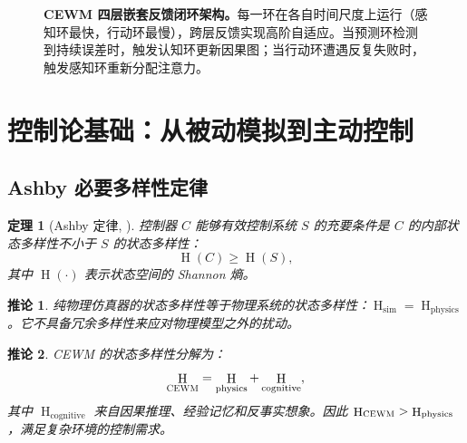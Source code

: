 \documentclass[11pt,a4paper]{article}
\newtheorem{theorem}{定理}[section]
\newtheorem{corollary}{推论}[theorem]
\newcommand{\CEWM}{\textsc{CEWM}}
\DeclareMathOperator{\Ent}{H}
\begin{document}
\begin{figure}[H]
{%
}
\caption{\textbf{\CEWM{} 四层嵌套反馈闭环架构。}每一环在各自时间尺度上运行（感知环最快，行动环最慢），跨层反馈实现高阶自适应。当预测环检测到持续误差时，触发认知环更新因果图；当行动环遭遇反复失败时，触发感知环重新分配注意力。}\label{fig:four-loops}
\end{figure}

\section{控制论基础：从被动模拟到主动控制}\label{sec:cybernetics}

\subsection{Ashby 必要多样性定律}

\begin{theorem}[Ashby 定律, \citeyear{ashby1956cybernetics}]\label{thm:ashby}
控制器 $C$ 能够有效控制系统 $S$ 的充要条件是 $C$ 的内部状态多样性不小于 $S$ 的状态多样性：
\begin{equation}\label{eq:ashby}
  \Ent(C) \geq \Ent(S),
\end{equation}
其中 $\Ent(\cdot)$ 表示状态空间的 Shannon 熵。
\end{theorem}

\begin{corollary}\label{cor:sim}
纯物理仿真器的状态多样性等于物理系统的状态多样性：$\Ent_{\mathrm{sim}} = \Ent_{\mathrm{physics}}$。它不具备\emph{冗余多样性}来应对物理模型之外的扰动。
\end{corollary}

\begin{corollary}\label{cor:cewm}
\CEWM{} 的状态多样性分解为：
\begin{equation}\label{eq:cewm-variety}
  \Ent_{\CEWM} = \Ent_{\mathrm{physics}} + \Ent_{\mathrm{cognitive}},
\end{equation}
其中 $\Ent_{\mathrm{cognitive}}$ 来自因果推理、经验记忆和反事实想象。因此 $\Ent_{\CEWM} > \Ent_{\mathrm{physics}}$，满足复杂环境的控制需求。
\end{corollary}
\end{document}
